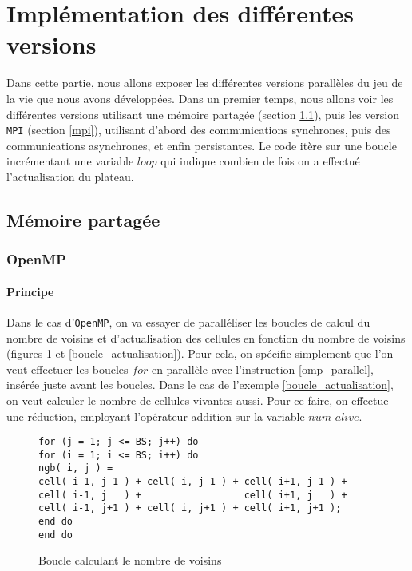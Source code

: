 \section{Implémentation des différentes versions} %
\label{sec:diff_rents_versions}
Dans cette partie, nous allons exposer les différentes versions parallèles du jeu de la vie que nous avons développées. Dans un premier temps, nous allons voir les différentes versions utilisant une mémoire partagée (section \ref{partagee}), puis les version \texttt{MPI} (section \ref{mpi}), utilisant d'abord des communications synchrones, puis des communications asynchrones, et enfin persistantes. Le code itère sur une boucle incrémentant une variable $loop$ qui indique combien de fois on a effectué l'actualisation du plateau. 

\subsection{Mémoire partagée}
\label{partagee}

\subsubsection{OpenMP}
\label{openmp}
\paragraph{Principe}
Dans le cas d'\texttt{OpenMP}, on va essayer de paralléliser les boucles de calcul du nombre de voisins et d'actualisation des cellules en fonction du nombre de voisins (figures \ref{boucle_voisins} et \ref{boucle_actualisation}). Pour cela, on spécifie simplement que l'on veut effectuer les boucles $for$ en parallèle avec l'instruction \ref{omp_parallel}, insérée juste avant les boucles. Dans le cas de l'exemple \ref{boucle_actualisation}, on veut calculer le nombre de cellules vivantes aussi. Pour ce faire, on effectue une réduction, employant l'opérateur addition sur la variable $num\_alive$. 

\begin{figure}[h!]
\begin{lstlisting}
for (j = 1; j <= BS; j++) do
for (i = 1; i <= BS; i++) do
ngb( i, j ) =
cell( i-1, j-1 ) + cell( i, j-1 ) + cell( i+1, j-1 ) +
cell( i-1, j   ) +                  cell( i+1, j   ) +
cell( i-1, j+1 ) + cell( i, j+1 ) + cell( i+1, j+1 );
end do
end do
\end{lstlisting}
\caption{Boucle calculant le nombre de voisins}
\label{boucle_voisins}
\end{figure}


